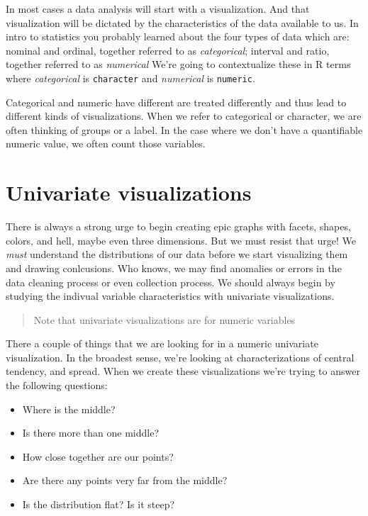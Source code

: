 \documentclass[
]{book}
\providecommand{\tightlist}{%
  \setlength{\itemsep}{0pt}\setlength{\parskip}{0pt}}
\begin{document}
In most cases a data analysis will start with a visualization. And that visualization will be dictated by the characteristics of the data available to us. In intro to statistics you probably learned about the four types of data which are: nominal and ordinal, together referred to as \emph{categorical}; interval and ratio, together referred to as \emph{numerical} We're going to contextualize these in R terms where \emph{categorical} is \texttt{character} and \emph{numerical} is \texttt{numeric}.

Categorical and numeric have different are treated differently and thus lead to different kinds of visualizations. When we refer to categorical or character, we are often thinking of groups or a label. In the case where we don't have a quantifiable numeric value, we often count those variables.

\hypertarget{univariate-visualizations}{%
\section{Univariate visualizations}\label{univariate-visualizations}}

There is always a strong urge to begin creating epic graphs with facets, shapes, colors, and hell, maybe even three dimensions. But we must resist that urge! We \emph{must} understand the distributions of our data before we start visualizing them and drawing conlcusions. Who knows, we may find anomalies or errors in the data cleaning process or even collection process. We should always begin by studying the indivual variable characteristics with univariate visualizations.

\begin{quote}
Note that univariate visualizations are for numeric variables
\end{quote}

There a couple of things that we are looking for in a numeric univariate visualization. In the broadest sense, we're looking at characterizations of central tendency, and spread. When we create these visualizations we're trying to answer the following questions:

\begin{itemize}
\tightlist
\item
  Where is the middle?
\item
  Is there more than one middle?
\item
  How close together are our points?
\item
  Are there any points very far from the middle?
\item
  Is the distribution flat? Is it steep?
\end{itemize}
\end{document}
